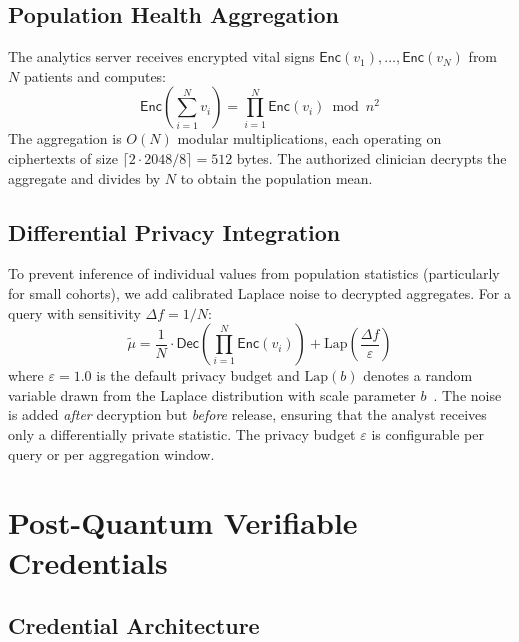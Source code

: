 \documentclass[conference,10pt]{IEEEtran}
\newcommand{\Enc}{\mathsf{Enc}}
\newcommand{\Dec}{\mathsf{Dec}}
\begin{document}
\subsection{Population Health Aggregation}

The analytics server receives encrypted vital signs $\Enc(v_1), \ldots, \Enc(v_N)$ from $N$ patients and computes:
\begin{equation}
\Enc\!\left(\sum_{i=1}^{N} v_i\right) = \prod_{i=1}^{N} \Enc(v_i) \bmod n^2
\end{equation}
The aggregation is $O(N)$ modular multiplications, each operating on ciphertexts of size $\lceil 2 \cdot 2048 / 8 \rceil = 512$ bytes. The authorized clinician decrypts the aggregate and divides by $N$ to obtain the population mean.

\subsection{Differential Privacy Integration}

To prevent inference of individual values from population statistics (particularly for small cohorts), we add calibrated Laplace noise to decrypted aggregates. For a query with sensitivity $\Delta f = 1/N$:
\begin{equation}
\tilde{\mu} = \frac{1}{N} \cdot \Dec\!\left(\prod_{i=1}^{N} \Enc(v_i)\right) + \text{Lap}\!\left(\frac{\Delta f}{\varepsilon}\right)
\end{equation}
where $\varepsilon = 1.0$ is the default privacy budget and $\text{Lap}(b)$ denotes a random variable drawn from the Laplace distribution with scale parameter $b$~\cite{dwork2006dp, dwork2014dp}. The noise is added \emph{after} decryption but \emph{before} release, ensuring that the analyst receives only a differentially private statistic. The privacy budget $\varepsilon$ is configurable per query or per aggregation window.

\section{Post-Quantum Verifiable Credentials}
\label{sec:vc}

\subsection{Credential Architecture}
\end{document}
